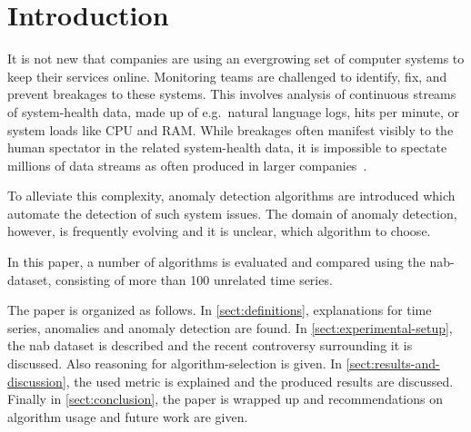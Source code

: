 \section{Introduction}
It is not new that companies are using an evergrowing set of computer systems
to keep their services online. Monitoring teams are challenged to identify, fix,
and prevent breakages to these systems. This involves analysis of continuous
streams of system-health data, made up of e.g.\ natural language logs, hits per
minute, or system loads like CPU and RAM\@. While breakages often manifest visibly
to the human spectator in the related system-health data, it is impossible to spectate
millions of data streams as often produced in larger companies~\cite[cf.][]{Zhu.2017}.

To alleviate this complexity, anomaly detection algorithms are introduced
which automate the detection of such system issues. The domain of anomaly detection,
however, is frequently evolving and it is unclear, which algorithm to choose.

In this paper, a number of algorithms is evaluated and compared using the
\gls{nab}-dataset, consisting of more than 100 unrelated time series.

The paper is organized as follows. In \cref{sect:definitions}, explanations for
time series, anomalies and anomaly detection are found. In \cref{sect:experimental-setup},
the \gls{nab} dataset is described and the recent controversy surrounding
it is discussed. Also reasoning for algorithm-selection is given.
In \cref{sect:results-and-discussion}, the used metric is explained and the
produced results are discussed. Finally in \cref{sect:conclusion}, the paper is
wrapped up and recommendations on algorithm usage and future work are given.